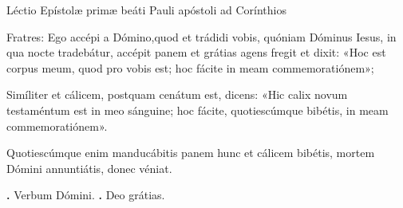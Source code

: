 
Léctio Epístolæ primæ beáti Pauli apóstoli ad Corínthios

Fratres: 
Ego accépi a Dómino,quod et trádidi vobis, quóniam Dóminus Iesus, in qua nocte tradebátur, accépit panem et grátias agens fregit et dixit: «Hoc est corpus meum, quod pro vobis est; hoc fácite in meam commemoratiónem»; 

Simíliter et cálicem, postquam cenátum est, dicens: «Hic calix novum testaméntum est in meo sánguine; hoc fácite, quotiescúmque bibétis, in meam commemoratiónem».

Quotiescúmque enim manducábitis panem hunc et cálicem bibétis, mortem Dómini annuntiátis, donec véniat.

\textbf{\Vbar.} Verbum Dómini.
\textbf{\Rbar.} Deo grátias.
\par